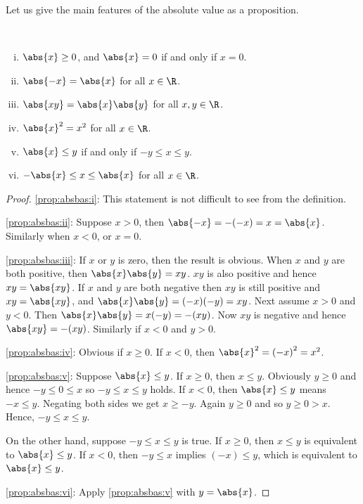 \documentclass[12pt]{book}
\begin{document}
Let us give the main features of the absolute
value as a proposition.

\begin{prop} \label{prop:absbas}
{\ }
\begin{enumerate}[(i)]
\item \label{prop:absbas:i} $\abs{x} \geq 0$, and $\abs{x}=0$ if and only if $x = 0$.
\item \label{prop:absbas:ii} $\abs{-x} = \abs{x}$ for all $x \in \R$.
\item \label{prop:absbas:iii} $\abs{xy} = \abs{x}\abs{y}$ for all $x,y \in \R$.
\item \label{prop:absbas:iv} $\abs{x}^2 = x^2$ for all $x \in \R$.
\item \label{prop:absbas:v} $\abs{x} \leq y$ if and only if $-y \leq x \leq y$.
\item \label{prop:absbas:vi} $-\abs{x} \leq x \leq \abs{x}$ for all $x \in \R$.
\end{enumerate}
\end{prop}

\begin{proof}
\ref{prop:absbas:i}: This statement is not difficult to see from the definition.

\medskip

\ref{prop:absbas:ii}: Suppose $x > 0$, then $\abs{-x} = -(-x) = x =
\abs{x}$.
Similarly when $x < 0$, or $x = 0$.

\medskip

\ref{prop:absbas:iii}:
If $x$ or $y$ is zero, then the result is obvious.
When $x$ and $y$ are both positive, then $\abs{x}\abs{y} = xy$.  $xy$ is also positive and hence $xy = \abs{xy}$.
If $x$ and $y$ are both negative
then $xy$ is still positive and $xy = \abs{xy}$, and
$\abs{x}\abs{y} = (-x)(-y) = xy$.
Next assume
$x > 0$ and $y < 0$.
Then $\abs{x}\abs{y} = x(-y) = -(xy)$.
Now
$xy$ is negative and hence $\abs{xy} = -(xy)$.
Similarly if
$x < 0$ and $y > 0$.

\medskip

\ref{prop:absbas:iv}:
Obvious if $x \geq 0$.
If $x < 0$, then $\abs{x}^2 = {(-x)}^2 =
x^2$.

\medskip

\ref{prop:absbas:v}:  Suppose $\abs{x} \leq y$.
If $x \geq 0$,
then $x \leq y$.
Obviously $y \geq 0$ and hence $-y \leq 0 \leq x$ so $-y \leq x \leq y$
holds.
If $x < 0$, then $\abs{x} \leq y$ means $-x \leq y$.
Negating both
sides we get $x \geq -y$.
Again $y \geq 0$ and so $y \geq 0 > x$.
Hence, $-y \leq x \leq y$.

On the other hand, suppose 
$-y \leq x \leq y$ is true.
If $x \geq 0$, then $x \leq y$ is equivalent
to $\abs{x} \leq y$.
If $x < 0$, then $-y \leq x$ implies
$(-x) \leq y$, which is equivalent to $\abs{x} \leq y$.

\medskip

\ref{prop:absbas:vi}:  Apply \ref{prop:absbas:v} with $y = \abs{x}$.
\end{proof}
\end{document}
